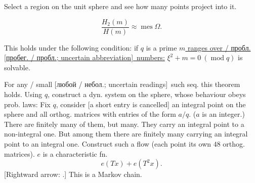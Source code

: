 Select a region on the unit sphere and see how many points project into it.
\par\noindent\begin{minipage}{\linewidth}
\begin{equation*}
\frac{H_2(m)}{H(m)}\approx\operatorname{mes}\Omega.
\end{equation*}
\end{minipage}\par
\par\noindent\begin{minipage}{\linewidth}
This holds under the following condition:
if $q$ is a prime
\underline{$m$ \textcolor{orange!65!black}{ranges over / пробл. [пробег. / пробл.; uncertain abbreviation]}\ numbers:} $\xi^2+m=0\ (\operatorname{mod}q)$ is solvable.
\end{minipage}\par
For \textcolor{orange!65!black}{any / small [любой / небол.; uncertain readings]}\ such seq. this theorem holds.
Using $q$, construct a dyn. system on the sphere,
whose behaviour obeys prob. laws:
Fix $q$, consider [a short entry is cancelled] an integral point on the sphere and all orthog. matrices with entries of the form $a/q$.
($a$ is an integer.) There are finitely many of them, but many.
They carry an integral point to a non-integral one.
But among them there are finitely many carrying an integral point to an integral one.
Construct such a flow
(each point its own $48$ orthog. matrices).
$e$ is a characteristic fn.
\begin{equation*}
e(Tx)+e(T^2x).
\end{equation*}
[Rightward arrow: .]
This is a Markov chain.

